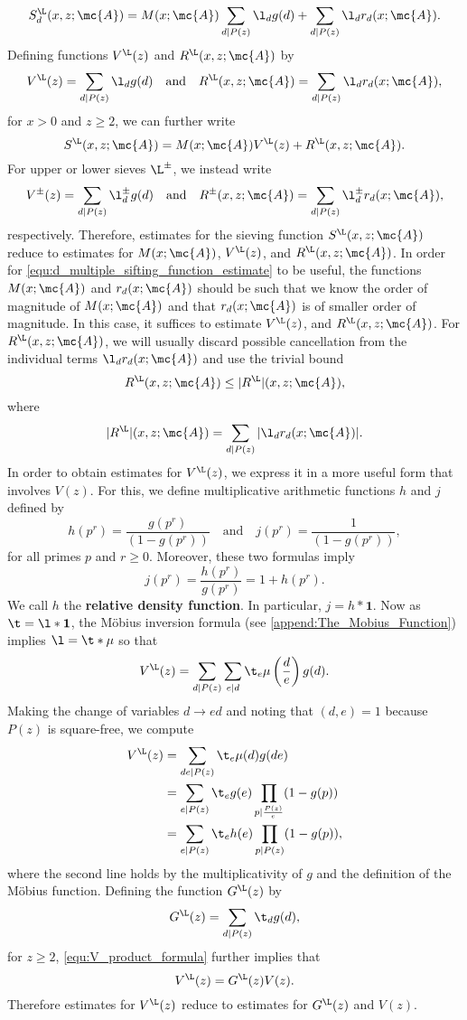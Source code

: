     \[
      S_{d}^{\L}(x,z;\mc{A}) = M(x;\mc{A})\sum_{d \mid P(z)}\l_{d}g(d)+\sum_{d \mid P(z)}\l_{d}r_{d}(x;\mc{A}).
    \]
    Defining functions $V^{\L}(z)$ and $R^{\L}(x,z;\mc{A})$ by
     \[
      V^{\L}(z) = \sum_{d \mid P(z)}\l_{d}g(d) \quad \text{and} \quad R^{\L}(x,z;\mc{A}) = \sum_{d \mid P(z)}\l_{d}r_{d}(x;\mc{A}),
    \]
    for $x > 0$ and $z \ge 2$, we can further write
    \[
      S^{\L}(x,z;\mc{A}) = M(x;\mc{A})V^{\L}(z)+R^{\L}(x,z;\mc{A}).
    \]
    For upper or lower sieves $\L^{\pm}$, we instead write
     \[
      V^{\pm}(z) = \sum_{d \mid P(z)}\l_{d}^{\pm}g(d) \quad \text{and} \quad R^{\pm}(x,z;\mc{A}) = \sum_{d \mid P(z)}\l_{d}^{\pm}r_{d}(x;\mc{A}),
    \]
    respectively. Therefore, estimates for the sieving function $S^{\L}(x,z;\mc{A})$ reduce to estimates for $M(x;\mc{A})$, $V^{\L}(z)$, and $R^{\L}(x,z;\mc{A})$. In order for \cref{equ:d_multiple_sifting_function_estimate} to be useful, the functions $M(x;\mc{A})$ and $r_{d}(x;\mc{A})$ should be such that we know the order of magnitude of $M(x;\mc{A})$ and that $r_{d}(x;\mc{A})$ is of smaller order of magnitude. In this case, it suffices to estimate $V^{\L}(z)$, and $R^{\L}(x,z;\mc{A})$. For $R^{\L}(x,z;\mc{A})$, we will usually discard possible cancellation from the individual terms $\l_{d}r_{d}(x;\mc{A})$ and use the trivial bound
    \[
      R^{\L}(x,z;\mc{A}) \le |R^{\L}|(x,z;\mc{A}),
    \]
    where
    \[
      |R^{\L}|(x,z;\mc{A}) = \sum_{d \mid P(z)}|\l_{d}r_{d}(x;\mc{A})|.
    \]
    In order to obtain estimates for $V^{\L}(z)$, we express it in a more useful form that involves $V(z)$. For this, we define multiplicative arithmetic functions $h$ and $j$ defined by
    \[
      h(p^{r}) = \frac{g(p^{r})}{(1-g(p^{r}))} \quad \text{and} \quad j(p^{r}) = \frac{1}{(1-g(p^{r}))},
    \]
    for all primes $p$ and $r \ge 0$. Moreover, these two formulas imply
    \[
      j(p^{r}) = \frac{h(p^{r})}{g(p^{r})} = 1+h(p^{r}).
    \]
    We call $h$ the \textbf{relative density function}. In particular, $j = h \ast \mathbf{1}$. Now as $\t = \l \ast \mathbf{1}$, the M\"obius inversion formula (see \cref{append:The_Mobius_Function}) implies $\l = \t \ast \mu$ so that
    \[
      V^{\L}(z) = \sum_{d \mid P(z)}\sum_{e \mid d}\t_{e}\mu\left(\frac{d}{e}\right)g(d).
    \]
    Making the change of variables $d \to ed$ and noting that $(d,e) = 1$ because $P(z)$ is square-free, we compute
    \begin{align*}
      V^{\L}(z) &= \sum_{de \mid P(z)}\t_{e}\mu(d)g(de) \\
      &= \sum_{e \mid P(z)}\t_{e}g(e)\prod_{p \mid \frac{P(z)}{e}}(1-g(p)) \\
      &= \sum_{e \mid P(z)}\t_{e}h(e)\prod_{p \mid P(z)}(1-g(p)),
    \end{align*}
    where the second line holds by the multiplicativity of $g$ and the definition of the M\"obius function. Defining the function $G^{\L}(z)$ by
    \[
      G^{\L}(z) = \sum_{d \mid P(z)}\t_{d}g(d),
    \]
    for $z \ge 2$, \cref{equ:V_product_formula} further implies that
    \[
      V^{\L}(z) = G^{\L}(z)V(z).
    \]
    Therefore estimates for $V^{\L}(z)$ reduce to estimates for $G^{\L}(z)$ and $V(z)$.